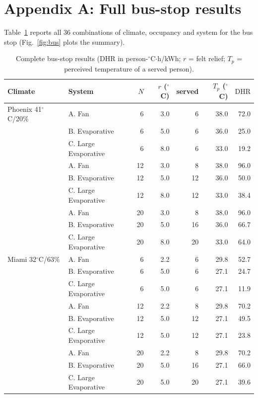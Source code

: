 \documentclass[11pt]{article}
\newcommand{\degrees}{\ensuremath{^\circ}}
\newcommand{\DHR}{\text{DHR}}
\begin{document}
\newpage
\section*{Appendix A: Full bus-stop results}
Table~\ref{tab:busfull} reports all 36 combinations of climate, occupancy and system for the bus stop (Fig.~\ref{fig:bus} plots the summary).
\begin{table}[H]\centering\small
\caption{Complete bus-stop results ($\DHR$ in person-$\degrees$C$\cdot$h/kWh; $r$ = felt relief; $T_p$ = perceived temperature of a served person).}\label{tab:busfull}
\begin{tabular}{@{}llrrrrr@{}}
\toprule
Climate & System & $N$ & $r$ (\degrees C) & served & $T_p$ (\degrees C) & $\DHR$\\
\midrule
Phoenix 41\degrees C/20\% & A. Fan & 6 & 3.0 & 6 & 38.0 & 72.0 \\
 & B. Evaporative & 6 & 5.0 & 6 & 36.0 & 25.0 \\
 & C. Large Evaporative & 6 & 8.0 & 6 & 33.0 & 19.2 \\
 & A. Fan & 12 & 3.0 & 8 & 38.0 & 96.0 \\
 & B. Evaporative & 12 & 5.0 & 12 & 36.0 & 50.0 \\
 & C. Large Evaporative & 12 & 8.0 & 12 & 33.0 & 38.4 \\
 & A. Fan & 20 & 3.0 & 8 & 38.0 & 96.0 \\
 & B. Evaporative & 20 & 5.0 & 16 & 36.0 & 66.7 \\
 & C. Large Evaporative & 20 & 8.0 & 20 & 33.0 & 64.0 \\
\addlinespace
Miami 32\degrees C/63\% & A. Fan & 6 & 2.2 & 6 & 29.8 & 52.7 \\
 & B. Evaporative & 6 & 5.0 & 6 & 27.1 & 24.7 \\
 & C. Large Evaporative & 6 & 5.0 & 6 & 27.1 & 11.9 \\
 & A. Fan & 12 & 2.2 & 8 & 29.8 & 70.2 \\
 & B. Evaporative & 12 & 5.0 & 12 & 27.1 & 49.5 \\
 & C. Large Evaporative & 12 & 5.0 & 12 & 27.1 & 23.8 \\
 & A. Fan & 20 & 2.2 & 8 & 29.8 & 70.2 \\
 & B. Evaporative & 20 & 5.0 & 16 & 27.1 & 66.0 \\
 & C. Large Evaporative & 20 & 5.0 & 20 & 27.1 & 39.6 \\

\end{tabular}
\end{table}
\end{document}
